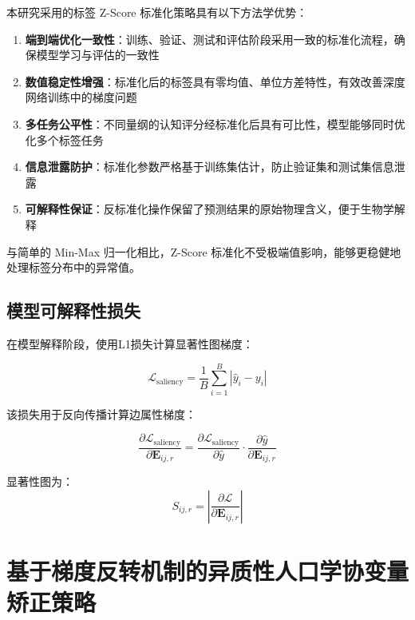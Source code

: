 本研究采用的标签 Z-Score 标准化策略具有以下方法学优势：

\begin{enumerate}
    \item \textbf{端到端优化一致性}：训练、验证、测试和评估阶段采用一致的标准化流程，确保模型学习与评估的一致性
    
    \item \textbf{数值稳定性增强}：标准化后的标签具有零均值、单位方差特性，有效改善深度网络训练中的梯度问题
    
    \item \textbf{多任务公平性}：不同量纲的认知评分经标准化后具有可比性，模型能够同时优化多个标签任务
    
    \item \textbf{信息泄露防护}：标准化参数严格基于训练集估计，防止验证集和测试集信息泄露
    
    \item \textbf{可解释性保证}：反标准化操作保留了预测结果的原始物理含义，便于生物学解释
\end{enumerate}

与简单的 Min-Max 归一化相比，Z-Score 标准化不受极端值影响，能够更稳健地处理标签分布中的异常值。

\newpage

\subsection{模型可解释性损失}

在模型解释阶段，使用L1损失计算显著性图梯度：

\begin{equation}
\mathcal{L}_{\text{saliency}} = \frac{1}{B} \sum_{i=1}^{B} | \hat{y}_i - y_i |
\end{equation}

该损失用于反向传播计算边属性梯度：

\begin{equation}
\frac{\partial \mathcal{L}_{\text{saliency}}}{\partial \mathbf{E}_{ij,r}} = \frac{\partial \mathcal{L}_{\text{saliency}}}{\partial \hat{y}} \cdot \frac{\partial \hat{y}}{\partial \mathbf{E}_{ij,r}}
\end{equation}

显著性图为：
\begin{equation}
S_{ij,r} = \left| \frac{\partial \mathcal{L}}{\partial \mathbf{E}_{ij,r}} \right|
\end{equation}

\newpage

\section{基于梯度反转机制的异质性人口学协变量矫正策略}

